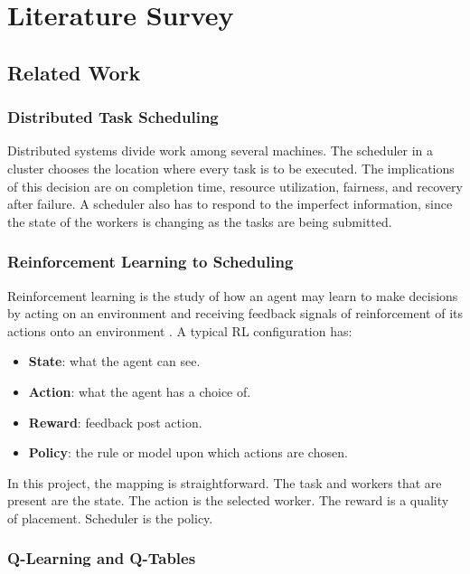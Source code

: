 \chapter{Literature Survey}
\label{section:lit_survey}

\section{Related Work}
\label{section:related_work}

\subsection{Distributed Task Scheduling}

Distributed systems divide work among several machines. The scheduler in a cluster chooses the location where every task is to be executed. The implications of this decision are on completion time, resource utilization, fairness, and recovery after failure. A scheduler also has to respond to the imperfect information, since the state of the workers is changing as the tasks are being submitted.

\subsection{Reinforcement Learning to Scheduling}

Reinforcement learning is the study of how an agent may learn to make decisions by acting on an environment and receiving feedback signals of reinforcement of its actions onto an environment \cite{sutton2018reinforcement}. A typical RL configuration has:

\begin{itemize}
    \item \textbf{State}: what the agent can see.
    \item \textbf{Action}: what the agent has a choice of.
    \item \textbf{Reward}: feedback post action.
    \item \textbf{Policy}: the rule or model upon which actions are chosen.
\end{itemize}

In this project, the mapping is straightforward. The task and workers that are present are the state. The action is the selected worker. The reward is a quality of placement. Scheduler is the policy.

\subsection{Q-Learning and Q-Tables}

